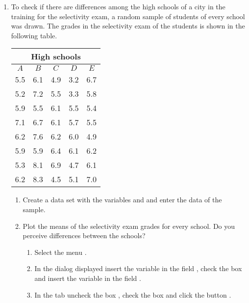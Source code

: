 \begin {enumerate}[leftmargin=*]
\item To check if there are differences among the high schools of a city in the training for the selectivity exam, a
random sample of students of every school was drawn.
The grades in the selectivity exam of the students is shown in the following table.
\begin{center}
\begin{tabular}{ccccc}
\multicolumn{5}{c}{High schools} \\
\toprule
$A$ & $B$ & $C$ & $D$ & $E$ \\
5.5 & 6.1 & 4.9 & 3.2 & 6.7 \\
5.2 & 7.2 & 5.5 & 3.3 & 5.8 \\
5.9 & 5.5 & 6.1 & 5.5 & 5.4 \\
7.1 & 6.7 & 6.1 & 5.7 & 5.5 \\
6.2 & 7.6 & 6.2 & 6.0 & 4.9 \\
5.9 & 5.9 & 6.4 & 6.1 & 6.2 \\
5.3 & 8.1 & 6.9 & 4.7 & 6.1 \\
6.2 & 8.3 & 4.5 & 5.1 & 7.0 \\
\bottomrule
\end{tabular}
\end{center}

\begin{enumerate}
\item Create a data set  with the variables  and  and enter the
data of the sample.

\item Plot the means of the selectivity exam grades for every school.
Do you perceive differences between the schools?
\begin{indication}
\begin{enumerate}
\item Select the menu .
\item In the dialog displayed insert the variable  in the field , check the box
 and insert the variable  in the field .
\item In the  tab uncheck the box , check the box
 and click the button .
\end{enumerate}
\end{indication}


\end{enumerate}
\end{enumerate}
